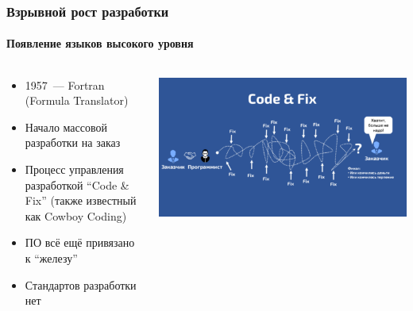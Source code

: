 \documentclass{../../slides-style}
\begin{document}
    \begin{frame}
        \frametitle{Взрывной рост разработки}
        \framesubtitle{Появление языков высокого уровня}
        \begin{columns}
            \begin{column}{0.5\textwidth}
                \begin{itemize}
                    \item 1957~--- Fortran (Formula Translator)
                    \item Начало массовой разработки на заказ
                    \item Процесс управления разработкой \enquote{Code \& Fix} (также известный как Cowboy Coding)
                    \item ПО всё ещё привязано к \enquote{железу}
                    \item Стандартов разработки нет
                \end{itemize}
            \end{column}
            \begin{column}{0.5\textwidth}
                \begin{center}
                    \includegraphics[width=\textwidth]{codeAndFix.png}
                \end{center}
            \end{column}
        \end{columns}
    \end{frame}
\end{document}
